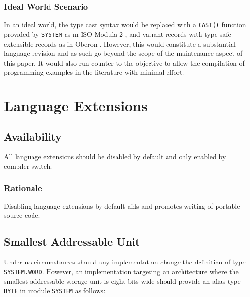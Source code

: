 \documentclass[10pt,a4paper]{article}
\begin{document}
\subsubsection{Ideal World Scenario}

In an ideal world, the type cast syntax would be replaced with a \verb|CAST()|
function provided by \verb|SYSTEM| as in ISO Modula-2 \cite{ISO96}, and variant
records with type safe extensible records as in Oberon \cite{Wirth90}. However,
this would constitute a substantial language revision and as such go beyond the
scope of the maintenance aspect of this paper. It would also run counter to the
objective to allow the compilation of programming examples in the literature
with minimal effort.


\section{Language Extensions}

\subsection{Availability}
All language extensions should be disabled by default and only enabled by
compiler switch.

\subsubsection{Rationale}
Disabling language extensions by default aids and promotes writing of portable
source code.


\subsection{Smallest Addressable Unit}

Under no circumstances should any implementation change the definition of type
\verb|SYSTEM.WORD|. However, an implementation targeting an architecture where
the smallest addressable storage unit is eight bits wide should provide an
alias type \verb|BYTE| in module \verb|SYSTEM| as follows:
\end{document}
